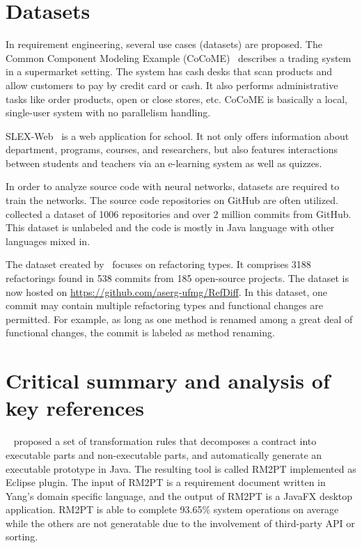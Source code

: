 \section{Datasets}
In requirement engineering, several use cases (datasets) are proposed.
The Common Component Modeling Example (CoCoME)~\cite{herold2008cocome} describes a trading system in a supermarket setting.
The system has cash desks that scan products and allow customers to pay by credit card or cash. It also performs administrative tasks like order products, open or close stores, etc.
CoCoME is basically a local, single-user system with no parallelism handling.

SLEX-Web~\cite{jantan2012extension} is a web application for school. It not only offers information about department, programs, courses, and researchers, but also features interactions between students and teachers via an e-learning system as well as quizzes.


In order to analyze source code with neural networks, datasets are required to train the networks. The source code repositories on GitHub are often utilized.
~\cite{jiang2017} collected a dataset of \num{1006} repositories and over 2 million commits from GitHub. This dataset is unlabeled and the code is mostly in Java language with other languages mixed in.

The dataset created by~\cite{tsantalis2018accurate} focuses on refactoring types. It comprises \num{3188} refactorings found in 538 commits from 185 open-source projects. The dataset is now hosted on \url{https://github.com/aserg-ufmg/RefDiff}. In this dataset, one commit may contain multiple refactoring types and functional changes are permitted. For example, as long as one method is renamed among a great deal of functional changes, the commit is labeled as method renaming.




\section{Critical summary and analysis of key references}

~\cite{yang2019automated} proposed a set of transformation rules that decomposes a contract into executable parts and non-executable parts, and automatically generate an executable prototype in Java.
The resulting tool is called RM2PT implemented as Eclipse plugin. The input of RM2PT is a requirement document written in Yang's domain specific language, and the output of RM2PT is a JavaFX desktop application. RM2PT is able to complete 93.65\% system operations on average while the others are not generatable due to the involvement of third-party API or sorting.

